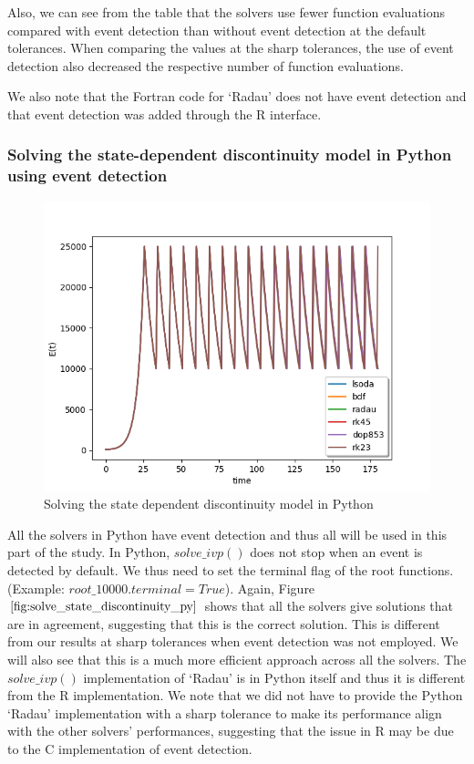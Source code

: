 Also, we can see from the table that the solvers use fewer function evaluations compared with event detection than without event detection at the default tolerances. When comparing the values at the sharp tolerances, the use of event detection also decreased the respective number of function evaluations.

We also note that the Fortran code for `Radau' does not have event detection and that event detection was added through the R interface.

\subsubsection{Solving the state-dependent discontinuity model in Python using event detection}
\begin{figure}[H]
\centering
\includegraphics[width=0.7\linewidth]{./figures/solve_state_discontinuity_py}
\caption{Solving the state dependent discontinuity model in Python}
\label{fig:solve_state_discontinuity_py}
\end{figure}
All the solvers in Python have event detection and thus all will be used in this part of the study. In Python, $solve\_ivp()$ does not stop when an event is detected by default. We thus need to set the terminal flag of the root functions.
(Example: $root\_10000.terminal = True$).
Again, Figure $\ref{fig:solve_state_discontinuity_py}$ shows that all the solvers give solutions that are in agreement, suggesting that this is the correct solution. This is different from our results at sharp tolerances when event detection was not employed. We will also see that this is a much more efficient approach across all the solvers. The $solve\_ivp()$ implementation of `Radau' is in Python itself and thus it is different from the R implementation. We note that we did not have to provide the Python `Radau' implementation with a sharp tolerance to make its performance align with the other solvers' performances, suggesting that the issue in R may be due to the C implementation of event detection.

